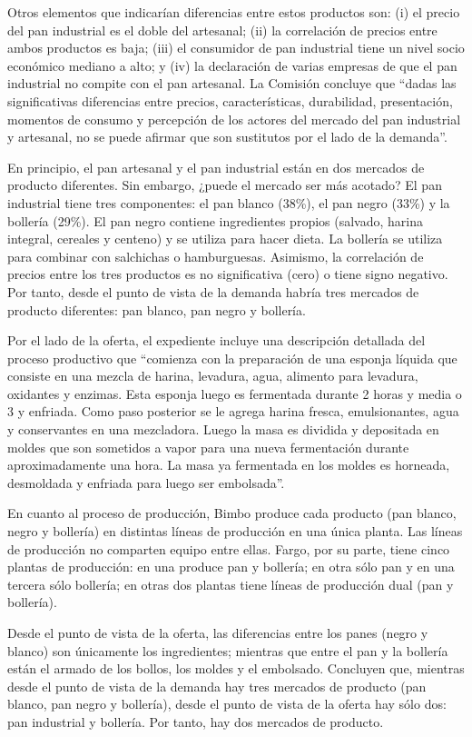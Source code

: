 \documentclass[
  12pt,
  spanish,
]{book}
\begin{document}
Otros elementos que indicarían diferencias entre estos productos son: (i) el precio del pan industrial es el doble del artesanal; (ii) la correlación de precios entre ambos productos es baja; (iii) el consumidor de pan industrial tiene un nivel socio económico mediano a alto; y (iv) la declaración de varias empresas de que el pan industrial no compite con el pan artesanal. La Comisión concluye que ``dadas las significativas diferencias entre precios, características, durabilidad, presentación, momentos de consumo y percepción de los actores del mercado del pan industrial y artesanal, no se puede afirmar que son sustitutos por el lado de la demanda''.

En principio, el pan artesanal y el pan industrial están en dos mercados de producto diferentes. Sin embargo, ¿puede el mercado ser más acotado? El pan industrial tiene tres componentes: el pan blanco (38\%), el pan negro (33\%) y la bollería (29\%). El pan negro contiene ingredientes propios (salvado, harina integral, cereales y centeno) y se utiliza para hacer dieta. La bollería se utiliza para combinar con salchichas o hamburguesas. Asimismo, la correlación de precios entre los tres productos es no significativa (cero) o tiene
signo negativo. Por tanto, desde el punto de vista de la demanda habría tres mercados de producto diferentes: pan blanco, pan negro y bollería.

Por el lado de la oferta, el expediente incluye una descripción detallada del proceso productivo que ``comienza con la preparación de una esponja líquida que consiste en una mezcla de harina, levadura, agua, alimento para levadura, oxidantes y enzimas. Esta esponja luego es fermentada durante 2 horas y media o 3 y enfriada. Como paso posterior se le agrega harina fresca, emulsionantes, agua y conservantes en una mezcladora. Luego la masa es dividida y depositada en moldes que son sometidos a vapor para una nueva fermentación durante aproximadamente una hora. La masa ya fermentada en los moldes es horneada, desmoldada y enfriada para luego ser embolsada''.

En cuanto al proceso de producción, Bimbo produce cada producto (pan blanco, negro y bollería) en distintas líneas de producción en una única planta. Las líneas de producción no comparten equipo entre ellas. Fargo, por su parte, tiene cinco plantas de producción: en una produce pan y bollería; en otra sólo pan y en una tercera sólo bollería; en otras dos plantas tiene líneas de producción dual (pan y bollería).

Desde el punto de vista de la oferta, las diferencias entre los panes (negro y blanco) son únicamente los ingredientes; mientras que entre el pan y la bollería están el armado de los bollos, los moldes y el embolsado. Concluyen que, mientras desde el punto de vista de la demanda hay tres mercados de producto (pan blanco, pan negro y bollería), desde el punto de vista de la oferta hay sólo dos: pan industrial y bollería. Por tanto, hay dos mercados de producto.
\end{document}
